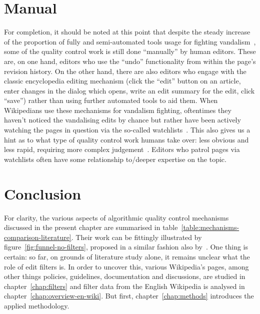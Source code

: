 \section{Manual}

For completion, it should be noted at this point that despite the steady increase of the proportion of fully and semi-automated tools usage for fighting vandalism~\cite{Geiger2009}, some of the quality control work is still done ``manually'' by human editors.
These are, on one hand, editors who use the ``undo'' functionality from within the page's revision history.
On the other hand, there are also editors who engage with the classic encyclopedia editing mechanism (click the ``edit'' button on an article, enter changes in the dialog which opens, write an edit summary for the edit, click ``save'') rather than using further automated tools to aid them.
When Wikipedians use these mechanisms for vandalism fighting, oftentimes they haven't noticed the vandalising edits by chance but rather have been actively watching the pages in question via the so-called watchlists~\cite{AstHal2018}.
This also gives us a hint as to what type of quality control work humans take over: less obvious and less rapid, requiring more complex judgement~\cite{AstHal2018}.
Editors who patrol pages via watchlists often have some relationship to/deeper expertise on the topic.

\section{Conclusion}

For clarity, the various aspects of algorithmic quality control mechanisms discussed in the present chapter are summarised in table~\ref{table:mechanisms-comparison-literature}.
Their work can be fittingly illustrated by figure~\ref{fig:funnel-no-filters}, proposed in a similar fashion also by~\cite{AstHal2018}.
One thing is certain: so far, on grounds of literature study alone, it remains unclear what the role of edit filters is.
In order to uncover this, various Wikipedia's pages, among other things policies, guidelines, documentation and discussions, are studied in chapter~\ref{chap:filters} and filter data from the English Wikipedia is analysed in chapter~\ref{chap:overview-en-wiki}.
But first, chapter~\ref{chap:methods} introduces the applied methodology.

